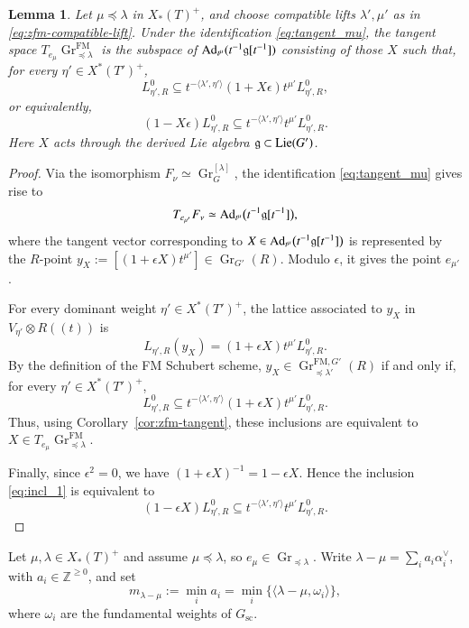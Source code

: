 \documentclass[a4paper, 12pt]{amsart}
\newtheorem{lemma}[theorem]{Lemma}
\theoremstyle{definition}
\newcommand{\C}{\mathbb C}
\newcommand{\Z}{\mathbb Z}
\newcommand{\g}{\mathfrak g}
\DeclareMathOperator{\Gr}{\mathrm{Gr}}
\begin{document}
\begin{lemma}\label{lem:Plucker}
Let $\mu\preceq\lambda$ in $X_*(T)^+$, and choose compatible lifts $\lambda',\mu'$ as in
\eqref{eq:zfm-compatible-lift}. Under the identification
\eqref{eq:tangent_mu}, the tangent space
$T_{e_\mu}\Gr^{\mathrm{FM}}_{\preceq\lambda}$ is the subspace of
${\rm Ad}_{t^\mu}(t^{-1}\g[t^{-1}])$ consisting of those $X$ such
that, for every $\eta'\in X^*(T')^+$,
\[
L^0_{\eta',R}\subseteq
 t^{-\langle\lambda',\eta'\rangle}
 (1+X\epsilon)t^{\mu'}L^0_{\eta',R},
\]
or equivalently,
\[
(1-X\epsilon)L^0_{\eta',R}\subseteq
 t^{-\langle\lambda',\eta'\rangle}t^{\mu'}L^0_{\eta',R}.
\]
Here $X$ acts through the derived Lie algebra $\g\subset{\rm Lie}(G')$.
\end{lemma}
\begin{proof}
 Via the isomorphism $F_\nu\simeq \Gr_G^{[\lambda]}$,  the identification \eqref{eq:tangent_mu} gives rise to 
\[ 
T_{e_{\mu'}} F_\nu \simeq {\rm Ad}_{t^{\mu}}
\bigl(t^{-1}\g[t^{-1}]\bigr),\]
where the tangent vector corresponding to
$X\in {\rm Ad}_{t^{\mu}} \bigl(t^{-1}\g[t^{-1}]\bigr)$ is represented by the $R$-point
$y_X:=[(1+\epsilon X)t^{\mu'}]\in \Gr_{G'}(R)$.  Modulo $\epsilon$, it gives the point $e_{\mu'}$.

For every dominant weight $\eta'\in X^*(T')^+$, the lattice associated
to $y_X$ in  $V_{\eta'}\otimes R((t))$ is
\[
L_{\eta',R}(y_X)
=
(1+\epsilon X)t^{\mu'}L^0_{\eta',R}.
\]
By the definition of the FM Schubert scheme, $y_X\in \Gr_{\preceq\lambda'}^{\mathrm{FM},G'}(R)$
if and only if, for every $\eta'\in X^*(T')^+$,
\begin{equation}\label{eq:incl_1}
L^0_{\eta',R} \subseteq  t^{-\langle\lambda',\eta'\rangle}
(1+\epsilon X)t^{\mu'}L^0_{\eta',R}.
\end{equation}
Thus, using Corollary~\ref{cor:zfm-tangent}, these inclusions are
equivalent to $X\in T_{e_\mu}\Gr_{\preceq\lambda}^{\mathrm{FM}}$.

Finally, since $\epsilon^2=0$, we have $(1+\epsilon X)^{-1}=1-\epsilon X$. Hence the inclusion \eqref{eq:incl_1} is equivalent to
\[
(1-\epsilon X)L^0_{\eta',R}
\subseteq
t^{-\langle\lambda',\eta'\rangle}
t^{\mu'}L^0_{\eta',R}.
\]
\end{proof}

Let $\mu,\lambda\in X_*(T)^+$ and assume $\mu\preceq\lambda$, so
$e_\mu\in\Gr_{\preceq\lambda}$. Write
$\lambda-\mu=\sum_i a_i\alpha_i^\vee$, with $a_i\in\Z^{\geq0}$, and set
\[
m_{\lambda-\mu}:=\min_i a_i
=\min_i\{\langle\lambda-\mu,\omega_i\rangle\},
\]
where $\omega_i$ are the fundamental weights of $G_{\mathrm{sc}}$.
\end{document}
